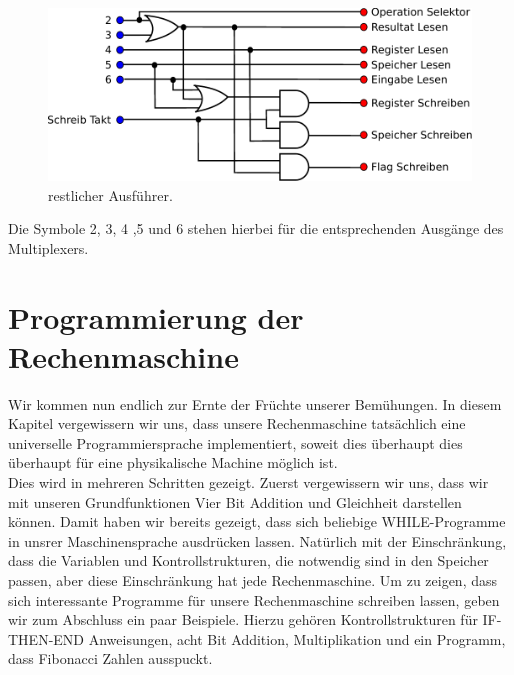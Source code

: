 \documentclass[11pt,a4paper,leqno]{report}
\numberwithin{equation}{chapter}
\begin{document}
\begin{figure}[H]
	\begin{center}
		\includegraphics[scale=0.7]{Bilder/aus_2.pdf}
		\caption{restlicher Ausf\"uhrer.}
	\end{center}
\end{figure}
\noindent
Die Symbole 2, 3, 4 ,5 und 6 stehen hierbei f\"ur die entsprechenden Ausg\"ange des Multiplexers.
\chapter{Programmierung der Rechenmaschine}
Wir kommen nun endlich zur Ernte der Früchte unserer Bemühungen. In diesem Kapitel vergewissern wir uns, dass unsere Rechenmaschine tats\"achlich eine universelle Programmiersprache implementiert, soweit dies \"uberhaupt dies \"uberhaupt f\"ur eine physikalische Machine m\"oglich ist.\\
Dies wird in mehreren Schritten gezeigt. Zuerst vergewissern wir uns, dass wir mit unseren Grundfunktionen Vier Bit Addition und Gleichheit darstellen k\"onnen. Damit haben wir bereits gezeigt, dass sich beliebige WHILE-Programme in unsrer Maschinensprache ausdr\"ucken lassen. Nat\"urlich mit der Einschr\"ankung, dass die Variablen und Kontrollstrukturen, die notwendig sind in den Speicher passen, aber diese Einschr\"ankung hat jede Rechenmaschine. Um zu zeigen, dass sich interessante Programme f\"ur unsere Rechenmaschine schreiben lassen, geben wir zum Abschluss ein paar Beispiele. Hierzu geh\"oren Kontrollstrukturen f\"ur IF-THEN-END Anweisungen, acht Bit Addition, Multiplikation und ein Programm, dass Fibonacci Zahlen ausspuckt.
\end{document}
